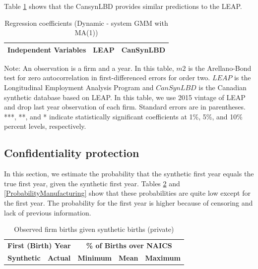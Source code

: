 \documentclass{article}
\begin{document}
Table \ref{Dynamic - system GMM with MA(1)} shows that the CansynLBD provides similar predictions to the LEAP.

\begin{table}[H]
  \centering
\begin{threeparttable}
 \caption{Regression coefficients (Dynamic - system GMM with MA(1))} \label{Dynamic - system GMM with MA(1)} \medskip
\renewcommand{\arraystretch}{1}
\begin{tabular}{l|c c| c c}
\toprule
\textbf{Independent Variables}&\multicolumn{2}{c|}{\textbf{LEAP}} &  \multicolumn{2}{c}{\textbf{CanSynLBD}}\\
\midrule

   \bottomrule
  \end{tabular} 
\begin{tablenotes}
\small
\item Note: An observation is a firm and a year. In this table, $m2$ is the Arellano-Bond test for zero autocorrelation in first-differenced errors for order two. $LEAP$ is the Longitudinal Employment Analysis Program and $CanSynLBD$ is the Canadian synthetic database based on LEAP. In this table, we use 2015 vintage of LEAP and drop last year observation of each firm. Standard errors are in parentheses. ***, **, and * indicate statistically significant coefficients at 1\%, 5\%, and 10\% percent levels, respectively.
 \end{tablenotes}
 \end{threeparttable}
\end{table}

\subsection{Confidentiality protection}

In this section, we estimate the probability that the synthetic first year equals the true first year, given the synthetic first year.  Tables \ref{ProbabilityPrivate} and \ref{ProbabilityManufacturing} show that these probabilities are quite low except for the first year.  The probability for the first year is higher because of censoring and lack of previous information.

\begin{table}[H]
\centering\footnotesize
\caption{Observed firm births given synthetic births (private)} \label{ProbabilityPrivate} \medskip
\renewcommand{\arraystretch}{1}
\begin{tabular}{c c| c c c}
\toprule
\multicolumn{2}{c|}{\textbf{First (Birth) Year}} &  \multicolumn{3}{c}{\textbf{\% of Births over NAICS}}\\
\textbf{Synthetic}&\textbf{Actual}&\textbf{Minimum}&\textbf{Mean}&\textbf{Maximum}\\
\midrule

\bottomrule
\end{tabular} 
\\
\justify
\end{table}
\end{document}
